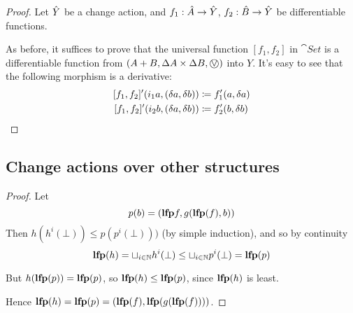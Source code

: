 \coproducts*
\begin{proof}
  \label{prf:coproducts}
  Let $\hat{Y}$ be a change action, and $f_1 : \hat{A} \rightarrow \hat{Y}$, $f_2 : \hat{B}
  \rightarrow \hat{Y}$ be differentiable functions.

  As before, it suffices to prove that the universal function $[f_1, f_2]$ in $\cat{Set}$ is a differentiable
  function from $\cstruct{A + B}{\changes{A} \times \changes{B}}{\cplusvee}$ into $Y$. It's easy to see
  that the following morphism is a derivative:
  \begin{align*}
    \derive{[f_1, f_2]} (i_1 a, (\change{a}, \change{b})) &\defeq f_1'(a, \change{a})\\
    \derive{[f_1, f_2]} (i_2 b, (\change{a}, \change{b})) &\defeq f_2'(b, \change{b})
  \end{align*}
\end{proof}

\subsection{Change actions over other structures}

\factoringFixpoints*
\begin{proof}
  \label{prf:factoringFixpoints}
  Let
  \begin{displaymath}
    p(b) = (\textbf{lfp} f, g(\textbf{lfp}(f), b))
  \end{displaymath}
  Then $h(h^i(\bot)) \leq p(p^i(\bot)))$ (by simple induction), and so by continuity
  \begin{displaymath}
    \textbf{lfp}(h) = \sqcup_{i \in \mathbb{N}} h^i(\bot) \leq \sqcup_{i \in \mathbb{N}} p^i(\bot) = \textbf{lfp}(p)
  \end{displaymath}

  But $h(\textbf{lfp}(p)) = \textbf{lfp}(p)$, so $\textbf{lfp}(h) \leq \textbf{lfp}(p)$, since $\textbf{lfp}(h)$ is least.

  Hence $\textbf{lfp}(h) = \textbf{lfp}(p) = (\textbf{lfp}(f), \textbf{lfp}(g(\textbf{lfp}(f))))$.
\end{proof}

